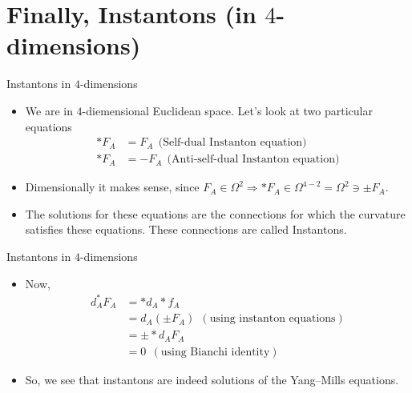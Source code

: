\documentclass{beamer}
\theoremstyle{definition}
\begin{document}
	\section{Finally, Instantons (in $4$-dimensions)}
	\begin{frame}{Instantons in $4$-dimensions}{}
		\begin{itemize}
            \item<1-> {We are in $4$-diemensional Euclidean space. Let's look at two particular equations
            \begin{align*}
            *F_A &= F_A\ \ \text{(Self-dual Instanton equation)}\\
            *F_A &= -F_A\ \ \text{(Anti-self-dual Instanton equation)}
            \end{align*}}
            \item<2-> {Dimensionally it makes sense, since $F_A \in \Omega^2 \Rightarrow *F_A \in \Omega^{4-2} = \Omega^2 \ni \pm F_A$.}
            \item<3-> {The solutions for these equations are the connections for which the curvature satisfies these equations. These connections are called Instantons.}
        \end{itemize}
	\end{frame}
	\begin{frame}{Instantons in $4$-dimensions}{}
		\begin{itemize}
            \item<1-> {Now,
            \begin{align*}
            d_A^*F_A &= *d_A*f_A\\
             &= d_A(\pm F_A)\ \ (\text{using instanton equations})\\
             &= \pm *d_AF_A\\
         &= 0\ \ (\text{using Bianchi identity})
        \end{align*}}
            \item<2-> {So, we see that instantons are indeed solutions of the Yang--Mills equations.}
        \end{itemize}
	\end{frame}
	
\end{document}
